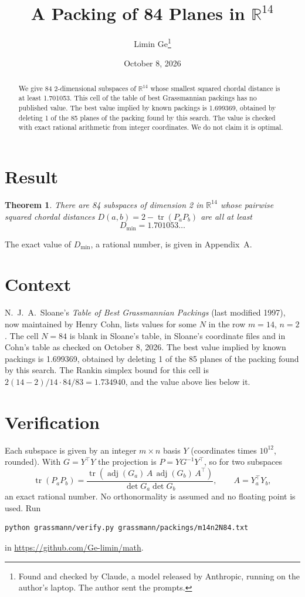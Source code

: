 \documentclass[11pt,a4paper]{article}
\title{A Packing of 84 Planes in $\mathbb{R}^{14}$}
\author{Limin Ge\thanks{Found and checked by Claude, a model released by Anthropic, running on the author's laptop. The author sent the prompts.}}
\date{October 8, 2026}
\newtheorem*{theorem}{Theorem}
\begin{document}
\maketitle
\begin{abstract}
We give 84 2-dimensional subspaces of $\mathbb{R}^{14}$ whose smallest squared chordal distance is at least 1.701053. This cell of the table of best Grassmannian packings has no published value. The best value implied by known packings is 1.699369, obtained by deleting 1 of the 85 planes of the packing found by this search. The value is checked with exact rational arithmetic from integer coordinates. We do not claim it is optimal.
\end{abstract}

\section{Result}
\begin{theorem}
There are 84 subspaces of dimension 2 in $\mathbb{R}^{14}$ whose pairwise squared chordal distances $D(a,b) = 2 - \operatorname{tr}(P_aP_b)$ are all at least
\[ D_{\min} = 1.701053\ldots \]
\end{theorem}
The exact value of $D_{\min}$, a rational number, is given in Appendix~A.


\section{Context}
N.~J.~A.~Sloane's \emph{Table of Best Grassmannian Packings} (last modified 1997), now maintained by Henry Cohn, lists values for some $N$ in the row $m=14$, $n=2$. The cell $N=84$ is blank in Sloane's table, in Sloane's coordinate files and in Cohn's table as checked on October 8, 2026. The best value implied by known packings is 1.699369, obtained by deleting 1 of the 85 planes of the packing found by this search. The Rankin simplex bound for this cell is $2(14-2)/14\cdot 84/83 = 1.734940$, and the value above lies below it.


\section{Verification}
Each subspace is given by an integer $m\times n$ basis $Y$ (coordinates times $10^{12}$, rounded). With $G=Y^\top Y$ the projection is $P=YG^{-1}Y^\top$, so for two subspaces
\[ \operatorname{tr}(P_aP_b)=\frac{\operatorname{tr}(\operatorname{adj}(G_a)\,A\,\operatorname{adj}(G_b)\,A^\top)}{\det G_a\det G_b},\qquad A=Y_a^\top Y_b, \]
an exact rational number. No orthonormality is assumed and no floating point is used. Run
\begin{verbatim}
python grassmann/verify.py grassmann/packings/m14n2N84.txt
\end{verbatim}
in \url{https://github.com/Ge-limin/math}.
\end{document}
